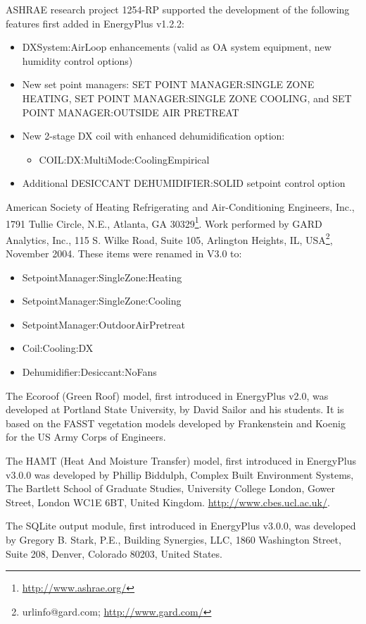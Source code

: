 ASHRAE research project 1254-RP supported the development of the following features first added in EnergyPlus v1.2.2: 
\begin{itemize}
  \item DXSystem:AirLoop enhancements (valid as OA system equipment, new humidity control options)
  \item New set point managers: SET POINT MANAGER:SINGLE ZONE HEATING, SET POINT MANAGER:SINGLE ZONE COOLING, and SET POINT MANAGER:OUTSIDE AIR PRETREAT
  \item New 2-stage DX coil with enhanced dehumidification option:
  \begin{itemize}
    \item COIL:DX:MultiMode:CoolingEmpirical
  \end{itemize}
  \item Additional DESICCANT DEHUMIDIFIER:SOLID setpoint control option
\end{itemize}

American Society of Heating Refrigerating and Air-Conditioning Engineers, Inc., 1791 Tullie Circle, N.E., Atlanta, GA 30329\footnote{\url{http://www.ashrae.org/}}. Work performed by GARD Analytics, Inc., 115 S. Wilke Road, Suite 105, Arlington Heights, IL, USA\footnote{url{info@gard.com}; \url{http://www.gard.com/}}, November 2004. These items were renamed in V3.0 to:
\begin{itemize}
  \item SetpointManager:SingleZone:Heating
  \item SetpointManager:SingleZone:Cooling
  \item SetpointManager:OutdoorAirPretreat
  \item Coil:Cooling:DX
  \item Dehumidifier:Desiccant:NoFans
\end{itemize}

The Ecoroof (Green Roof) model, first introduced in EnergyPlus v2.0, was developed at Portland State University, by David Sailor and his students. It is based on the FASST vegetation models developed by Frankenstein and Koenig for the US Army Corps of Engineers.

The HAMT (Heat And Moisture Transfer) model, first introduced in EnergyPlus v3.0.0 was developed by Phillip Biddulph, Complex Built Environment Systems, The Bartlett School of Graduate Studies, University College London, Gower Street, London WC1E 6BT, United Kingdom. \url{http://www.cbes.ucl.ac.uk/}.

The SQLite output module, first introduced in EnergyPlus v3.0.0, was developed by Gregory B. Stark, P.E., Building Synergies, LLC, 1860 Washington Street, Suite 208, Denver, Colorado 80203, United States.

